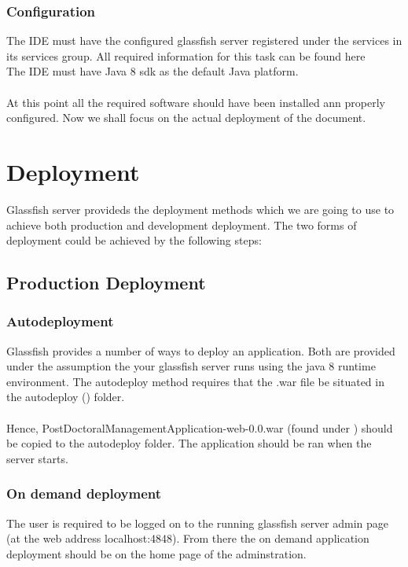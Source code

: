 \documentclass[12pt]{article}
\begin{document}
\subsubsection{Configuration}
The IDE must have the configured glassfish server registered under the services in its services group. All required information for this task can be found here \textbf{}
\\
The IDE must have Java 8 sdk as the default Java platform.\\
\\
At this point all the required software should have been installed ann properly configured. Now we shall focus on the actual deployment of the document.

\section{Deployment}
Glassfish server provideds the deployment methods which we are going to use to achieve both production and development deployment. The two forms of deployment could be achieved by the following steps: 
\subsection{Production Deployment}

\subsubsection{Autodeployment}
Glassfish provides a number of ways to deploy an application. Both are provided under the assumption the your glassfish server runs using the java 8 runtime environment. The autodeploy method requires that the .war file be situated in the autodeploy (\textbf{}) folder.\\ 
\\
Hence, PostDoctoralManagementApplication-web-0.0.war (found under \textbf{}) should be copied to the autodeploy folder. The application should be ran when the server starts.

\subsubsection{On demand deployment}
The user is required to be logged on to the running glassfish server admin page (at the web address localhost:4848). From there the on demand application deployment should be on the home page of the adminstration.
\end{document}
